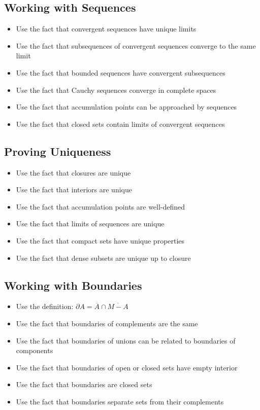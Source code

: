 \subsection*{Working with Sequences}
\begin{itemize}
\item Use the fact that convergent sequences have unique limits
\item Use the fact that subsequences of convergent sequences converge to the same limit
\item Use the fact that bounded sequences have convergent subsequences
\item Use the fact that Cauchy sequences converge in complete spaces
\item Use the fact that accumulation points can be approached by sequences
\item Use the fact that closed sets contain limits of convergent sequences
\end{itemize}

\subsection*{Proving Uniqueness}
\begin{itemize}
\item Use the fact that closures are unique
\item Use the fact that interiors are unique
\item Use the fact that accumulation points are well-defined
\item Use the fact that limits of sequences are unique
\item Use the fact that compact sets have unique properties
\item Use the fact that dense subsets are unique up to closure
\end{itemize}

\subsection*{Working with Boundaries}
\begin{itemize}
\item Use the definition: $\partial A = \overline{A} \cap \overline{M - A}$
\item Use the fact that boundaries of complements are the same
\item Use the fact that boundaries of unions can be related to boundaries of components
\item Use the fact that boundaries of open or closed sets have empty interior
\item Use the fact that boundaries are closed sets
\item Use the fact that boundaries separate sets from their complements
\end{itemize}

